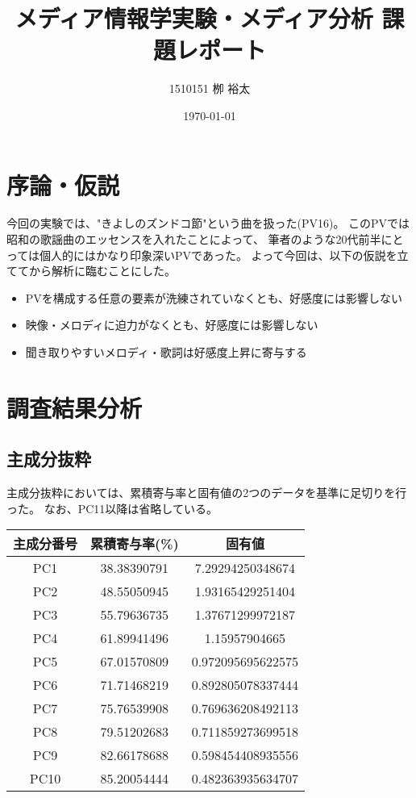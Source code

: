 \documentclass[11pt,a4paper, uplatex]{jsarticle}
\title{メディア情報学実験・メディア分析 課題レポート}
\author{1510151  栁 裕太}
\date{\today}
\begin{document}
\maketitle
\section{序論・仮説}
今回の実験では、"きよしのズンドコ節"という曲を扱った(PV16)。
このPVでは昭和の歌謡曲のエッセンスを入れたことによって、
筆者のような20代前半にとっては個人的にはかなり印象深いPVであった。
よって今回は、以下の仮説を立ててから解析に臨むことにした。

\begin{itemize}
  \item PVを構成する任意の要素が洗練されていなくとも、好感度には影響しない
  \item 映像・メロディに迫力がなくとも、好感度には影響しない
  \item 聞き取りやすいメロディ・歌詞は好感度上昇に寄与する
\end{itemize}

\section{調査結果分析}
\subsection{主成分抜粋}
主成分抜粋においては、累積寄与率と固有値の2つのデータを基準に足切りを行った。
なお、PC11以降は省略している。

\begin{table}[htbp]
  \begin{center}
    \begin{tabular}{c|c|c}
      \hline
      主成分番号 & 累積寄与率(\%) & 固有値 \\ \hline \hline
      PC1 & 38.38390791 & 7.29294250348674 \\
      PC2 & 48.55050945 & 1.93165429251404 \\
      PC3 & 55.79636735 & 1.37671299972187 \\
      PC4 & 61.89941496 & 1.15957904665 \\
      PC5 & 67.01570809 & 0.972095695622575 \\
      PC6 & 71.71468219 & 0.892805078337444 \\
      PC7 & 75.76539908 & 0.769636208492113 \\
      PC8 & 79.51202683 & 0.711859273699518 \\
      PC9 & 82.66178688 & 0.598454408935556 \\
      PC10 & 85.20054444 & 0.482363935634707 \\
      \hline
    \end{tabular}
  \end{center}
\end{table}
\end{document}
